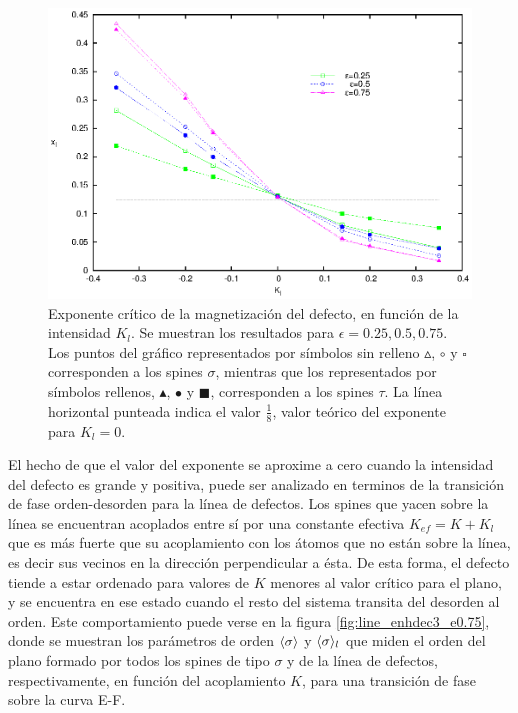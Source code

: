 \begin{figure}[h!]
	\begin{center}
		\includegraphics[width=\figwidth]{graf/exp/exp_all_01.eps}
	\end{center}
	
	\caption{Exponente crítico de la magnetización del defecto, en función de la intensidad $K_{l}$. Se muestran los resultados para $\epsilon=0.25,0.5,0.75$.
	Los puntos del gráfico representados por símbolos sin relleno $\vartriangle$, $\circ$ y $\square$ corresponden a los spines $\sigma$, mientras que los 
	representados por símbolos rellenos, $\blacktriangle$, $\bullet$ y $\blacksquare$, corresponden a los spines $\tau$. La línea horizontal punteada
	indica el valor $\frac{1}{8}$, valor teórico del exponente para $K_{l}=0$.}
	\label{fig:exps_st_all}
\end{figure}

El hecho de que el valor del exponente se aproxime a cero cuando la intensidad del defecto es grande y positiva, puede ser analizado
 en terminos de la transici\'on de fase orden-desorden para la l\'inea de defectos. Los spines que yacen sobre la l\'inea
 se encuentran acoplados entre s\'i por una constante efectiva $K_{ef}=K+K_{l}$ que es m\'as fuerte que su acoplamiento
 con los \'atomos que no est\'an sobre la l\'inea, es decir sus vecinos en la direcci\'on perpendicular a ésta. De esta forma,
 el defecto tiende a estar ordenado para valores de $K$ menores al valor cr\'itico para el plano, y se encuentra en ese estado cuando
 el resto del sistema transita del desorden al orden. Este comportamiento puede verse en la figura \ref{fig:line_enhdec3_e0.75}, donde
 se muestran los par\'ametros de orden $\langle \sigma \rangle$ y $\langle \sigma \rangle_{l}$ que miden el orden del plano formado por todos los spines
 de tipo $\sigma$ y de la l\'inea de defectos, respectivamente, en funci\'on del acoplamiento $K$, para una transici\'on de fase sobre
 la curva E-F.\\


